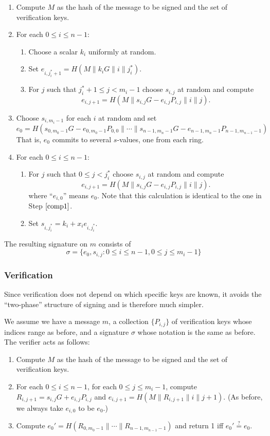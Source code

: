 \documentclass[letterpaper]{article}
\begin{document}
\begin{enumerate}
\item Compute $M$ as the hash of the message to be signed and the set of
verification keys.
\item For each $0\leq i\leq n-1$:
\begin{enumerate}
\item Choose a scalar $k_i$ uniformly at random.
\item Set $e_{i,j^*_i+1} = H(M\| k_iG \| i \| j^*_i)$.
\item For $j$ such that $j^*_i+1\leq j< m_i-1$ choose $s_{i,j}$ at random and
compute
\[ e_{i,j+1} = H(M\| s_{i,j}G - e_{i,j}P_{i,j} \| i \| j). \]
\label{comp1}
\end{enumerate}
\item Choose $s_{i,m_i-1}$ for each $i$ at random and set
\[ e_0 = H(s_{0,m_0-1}G - e_{0,m_0-1}P_{0,0} \| \cdots \| s_{n-1,m_n-1}G - e_{n-1,m_n-1}P_{n-1,m_{n-1}-1}) \]
That is, $e_0$ commits to several $s$-values, one from each ring.
\item For each $0\leq i\leq n-1$:
\begin{enumerate}
\item For $j$ such that $0\leq j< j^*_i$ choose $s_{i,j}$ at random and
compute
\[ e_{i,j+1} = H(M\| s_{i,j}G - e_{i,j}P_{i,j}\|i\|j). \]
where ``$e_{i,0}$'' means $e_0$. Note that this calculation is identical to
the one in Step $\ref{comp1}$.
\item Set $s_{i,j^*_i} = k_i + x_ie_{i,j^*_i}$.
\end{enumerate}
\end{enumerate}

The resulting signature on $m$ consists of
\[ \sigma = \{ e_0, s_{i, j} : 0\leq i\leq n-1, 0\leq j\leq m_i - 1 \} \]

\subsubsection{Verification}

Since verification does not depend on which specific keys are known, it
avoids the ``two-phase'' structure of signing and is therefore much
simpler.

We assume we have a message $m$, a collection $\{ P_{i,j} \}$ of verification
keys whose indices range as before, and a signature $\sigma$ whose notation
is the same as before. The verifier acts as follows:

\begin{enumerate}
\item Compute $M$ as the hash of the message to be signed and the set of
verification keys.
\item For each $0\leq i\leq n -1$,
      for each $0\leq j\leq m_i - 1$, compute $R_{i,j+1} = s_{i,j}G + e_{i,j}P_{i,j}$
and $e_{i,j+1} = H(M\|R_{i,j+1}\|i\|j+1)$. (As before, we always take $e_{i,0}$ to be $e_0$.)
\item Compute $e_0' = H(R_{0,m_0-1} \|\cdots \| R_{n-1,m_{n-1}-1})$ and return 1 iff $e_0'\stackrel{?}{=} e_0$.
\end{enumerate}
\end{document}
